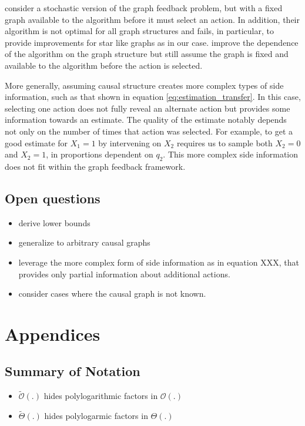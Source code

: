 \documentclass[11pt,a4paper]{article}
\newcommand{\bigo}[1]{\mathcal{O}\left( #1 \right)}
\newcommand{\bigotilde}[1]{\tilde{\mathcal{O}}\left( #1 \right)}
\newcommand{\bigtheta}[1]{\Theta\left( #1 \right)}
\newcommand{\bigthetatilde}[1]{\tilde{\Theta}\left( #1 \right)}
\begin{document}
\cite{Lelarge2012} consider a stochastic version of the graph feedback problem, but with a fixed graph available to the algorithm before it must select an action. In addition, their algorithm is not optimal for all graph structures and fails, in particular, to provide improvements for star like graphs as in our case. \cite{Buccapatnam2014} improve the dependence of the algorithm on the graph structure but still assume the graph is fixed and available to the algorithm before the action is selected. 

More generally, assuming causal structure creates more complex types of side information, such as that shown in equation \ref{eq:estimation_transfer}. In this case, selecting one action does not fully reveal an alternate action but provides some information towards an estimate. The quality of the estimate notably depends not only on the number of times that action was selected. For example, to get a good estimate for $X_1 = 1$ by intervening on $X_2$ requires us to sample both $X_2=0$ and $X_2=1$, in proportions dependent on $q_2$. This more complex side information does not fit within the graph feedback framework.







\subsection{Open questions}

\begin{itemize}
\item derive lower bounds
\item generalize to arbitrary causal graphs
\item leverage the more complex form of side information as in equation XXX, that provides only partial information about additional actions.
\item consider cases where the causal graph is not known.
\end{itemize}

\section{Appendices}

\subsection{Summary of Notation}
\begin{itemize}
\item $\bigotilde{.}$ hides polylogarithmic factors in $\bigo{.}$
\item $\bigthetatilde{.}$ hides polylogarmic factors in $\bigtheta{.}$
\end{itemize}

\end{document}
